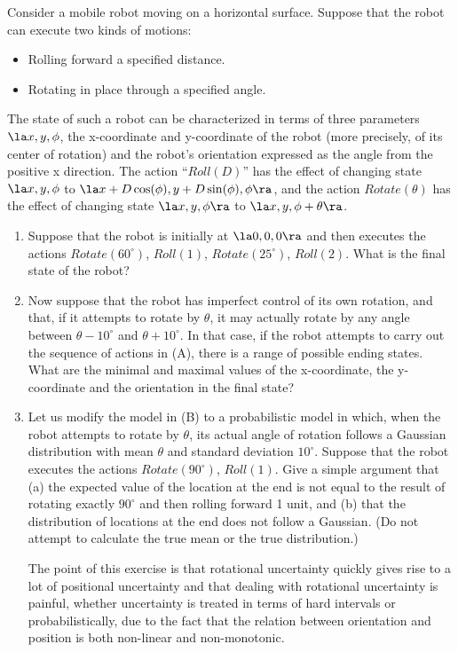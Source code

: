 
\begin{exercise}
Consider a mobile robot moving on a horizontal surface.  Suppose that the
robot can execute two kinds of motions:
\begin{itemize}
\item Rolling forward a specified distance.
\item Rotating in place through a specified angle.
\end{itemize}
The state of such a robot can be characterized in terms of three 
parameters $\la x,y,\phi$, the x-coordinate and y-coordinate of the robot
(more precisely, of its center of rotation) and the robot's orientation 
expressed as the angle from the positive x direction.  The action
``$Roll(D)$'' has the effect of changing state $\la x,y,\phi$ to
$\la x+D \cos(\phi), y+D \sin(\phi), \phi \ra$, and the action $Rotate(\theta)$
has the effect of changing state $\la x,y,\phi \ra$ to 
$\la x,y, \phi + \theta \ra$.

\begin{enumerate}
\item
Suppose that the robot is initially at $\la 0,0,0 \ra$ and then executes
the actions $Rotate(60^{\circ})$, $Roll(1)$, $Rotate(25^{\circ})$, $Roll(2)$.
What is the final state of the robot?

\item Now suppose that the robot has imperfect control of its own rotation,
and that, if it attempts to rotate by $\theta$, it may actually rotate by any
angle between $\theta-10^{\circ}$ and $\theta+10^{\circ}$. In that case,
if the robot attempts to carry out the sequence of actions in (A), there is
a range of possible ending states. What are the minimal and maximal values
of the x-coordinate, the y-coordinate and the orientation in the final state?

\item Let us modify the model in (B) to a probabilistic model in which,
when the robot attempts to rotate by $\theta$, its actual angle of rotation
follows a Gaussian distribution with mean $\theta$ and standard deviation
$10^{\circ}$. Suppose that the robot executes the actions $Rotate(90^{\circ})$,
$Roll(1)$.  Give a simple argument that (a) the expected value of the location
at the end is not equal to the result of rotating exactly $90^{\circ}$ and
then rolling forward 1 unit, and (b) that the distribution of locations
at the end does not follow a Gaussian.  (Do not attempt to calculate 
the true mean or the true distribution.) 

The point of this exercise is that rotational uncertainty quickly gives rise
to a lot of positional uncertainty and 
that dealing with rotational uncertainty is 
painful, whether uncertainty is treated in terms of hard intervals
or probabilistically, due to the fact that the relation between orientation
and position is both non-linear and non-monotonic.
\end{enumerate}
\end{exercise} 

